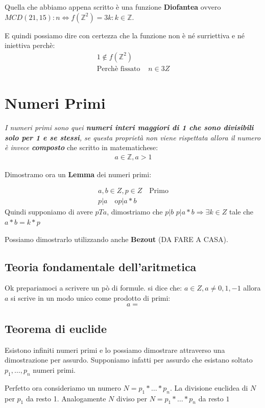 \documentclass{article}
\begin{document}
Quella che abbiamo appena scritto è una funzione \textbf{Diofantea} ovvero $MCD(21,15) : n \Leftrightarrow f(\mathbb{Z}^{2})={3k : k \in \mathbb{Z}}$. \par

E quindi possiamo dire con certezza che la funzione non è né surriettiva e né iniettiva perchè:
\begin{align*}
        1 \notin f(\mathbb{Z}^{2}) \\
        \textrm{Perchè fissato } & n \in 3Z
\end{align*}







\newpage
\section{Numeri Primi}
\textit{I numeri primi sono quei \textbf{numeri interi maggiori di 1 che sono divisibili solo per 1 e se stessi}, se questa proprietà non viene rispettata allora il numero è invece \textbf{composto}} che scritto in matematichese:
\begin{align}
       a \in \mathbb{Z}, a>1
\end{align}

Dimostramo ora un \textbf{Lemma} dei numeri primi:

\begin{align}
        a,b \in Z, p \in Z \quad \textrm{Primo} \\
        p | a \quad \textrm{o} p | a*b
\end{align}
Quindi supponiamo di avere $p T a$, dimostriamo che $p|b$
$p | a*b \Rightarrow \exists k \in Z$ tale che $a*b = k*p$

Possiamo dimostrarlo utilizzando anche \textbf{Bezout} (DA FARE A CASA).


\subsection{Teoria fondamentale dell'aritmetica}
Ok prepariamoci a scrivere un pò di formule. \newline
si dice che: $a \in Z, a \not = 0,1,-1$ allora $a$ si scrive in un modo unico come prodotto di primi:
\begin{equation}
a =
\end{equation}


\subsection{Teorema di euclide}
Esistono infiniti numeri primi e lo possiamo dimostrare attraverso una dimostrazione per assurdo.
Supponiamo infatti per assurdo che esistano soltato $p_1,\ldots,p_n$ numeri primi. \par
Perfetto ora consideriamo un numero $N = p_1* \ldots * p_n$.
La divisione euclidea di $N$ per $p_1$ da resto 1.
Analogamente $N$ diviso per $N = p_1* \ldots * p_n$ da resto $1$ \par
\end{document}

